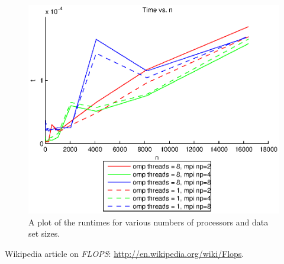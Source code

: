 \begin{figure}[htbp]
  \centering
  \includegraphics[]{graphics/runtime.eps}
  \caption{A plot of the runtimes for various numbers of processors and data set sizes.}
  \label{fig:runtime}
\end{figure}

\begin{thebibliography}{1}
   Wikipedia article on \emph{FLOPS}: \url{http://en.wikipedia.org/wiki/Flops}.
\end{thebibliography}


